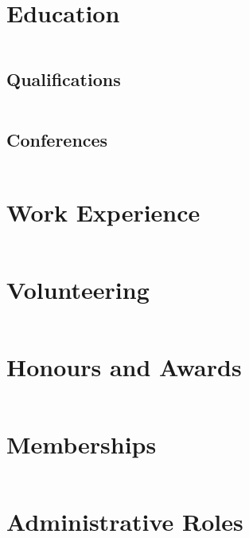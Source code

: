 \documentclass[
    a4paper,
    oneside,
    10pt
]{article}
\newenvironment{timeline}{%
	\begin{longtable}{ c | c }%
}{%
	\end{longtable}%
}
\begin{document}
    
    \section{Education}
    \begin{timeline}
    		
    \end{timeline}
    
    \subsection{Qualifications}
    \begin{timeline}
    		
    \end{timeline}
    
    \subsection{Conferences}
    \begin{timeline}
    		
    \end{timeline}
    
    \section{Work Experience}
	\begin{timeline}
    		
    \end{timeline}
    
    \section{Volunteering}
	\begin{timeline}
    		
    \end{timeline}
    
	\section{Honours and Awards}
    \begin{timeline}
    		
    \end{timeline}
    
    \section{Memberships}
    \begin{timeline}
    		
    \end{timeline}
    
    \section{Administrative Roles}
    \begin{timeline}
    		
    \end{timeline}
    
    \pagebreak
    \tableofcontents
\end{document}
